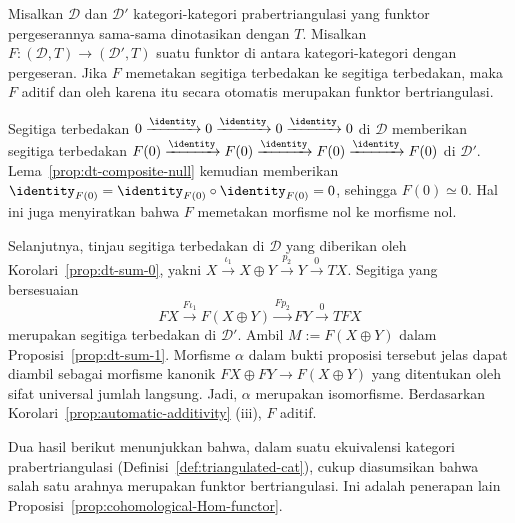\begin{korolari}\label{prop:triangulated-automatic-additivity}
	Misalkan $\mathcal{D}$ dan $\mathcal{D}'$ kategori-kategori
	prabertriangulasi yang funktor pergeserannya sama-sama dinotasikan dengan
	$T$. Misalkan $F: (\mathcal{D}, T) \to (\mathcal{D}', T)$ suatu funktor di
	antara kategori-kategori dengan pergeseran. Jika $F$ memetakan segitiga
	terbedakan ke segitiga terbedakan, maka $F$ aditif dan oleh karena itu secara
	otomatis merupakan funktor bertriangulasi.
\end{korolari}

\begin{bukti}
	Segitiga terbedakan
	$0 \xrightarrow{\identity} 0 \xrightarrow{\identity} 0
	\xrightarrow{\identity} 0$ di $\mathcal{D}$ memberikan segitiga
	terbedakan
	$F(0) \xrightarrow{\identity} F(0) \xrightarrow{\identity} F(0)
	\xrightarrow{\identity} F(0)$ di $\mathcal{D}'$.
	Lema~\ref{prop:dt-composite-null} kemudian memberikan
	$\identity_{F(0)} = \identity_{F(0)} \circ \identity_{F(0)} = 0$, sehingga
	$F(0) \simeq 0$. Hal ini juga menyiratkan bahwa $F$ memetakan morfisme nol
	ke morfisme nol.

	Selanjutnya, tinjau segitiga terbedakan di $\mathcal{D}$ yang diberikan
	oleh Korolari~\ref{prop:dt-sum-0}, yakni
	$X \xrightarrow{\iota_1} X \oplus Y \xrightarrow{p_2} Y
	\xrightarrow{0} TX$. Segitiga yang bersesuaian
	\[ FX \xrightarrow{F\iota_1} F(X \oplus Y) \xrightarrow{Fp_2} FY \xrightarrow{0} TFX \]
	merupakan segitiga terbedakan di $\mathcal{D}'$. Ambil
	$M := F(X \oplus Y)$ dalam Proposisi~\ref{prop:dt-sum-1}. Morfisme $\alpha$
	dalam bukti proposisi tersebut jelas dapat diambil sebagai morfisme kanonik
	$FX \oplus FY \to F(X \oplus Y)$ yang ditentukan oleh sifat universal
	jumlah langsung. Jadi, $\alpha$ merupakan isomorfisme. Berdasarkan
	Korolari~\ref{prop:automatic-additivity} (iii), $F$ aditif.
\end{bukti}

Dua hasil berikut menunjukkan bahwa, dalam suatu ekuivalensi kategori
prabertriangulasi (Definisi~\ref{def:triangulated-cat}), cukup diasumsikan bahwa
salah satu arahnya merupakan funktor bertriangulasi. Ini adalah penerapan lain
Proposisi~\ref{prop:cohomological-Hom-functor}.

